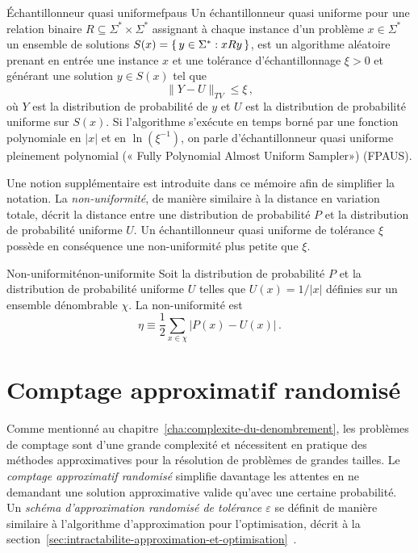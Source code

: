 \begin{maindefinition}{Échantillonneur quasi uniforme}{fpaus}
    Un échantillonneur quasi uniforme pour une relation binaire $R \subseteq \Sigma^{*} \times \Sigma^{*}$ assignant à chaque instance d'un problème $x \in \Sigma^{*}$ un ensemble de solutions $S(x) = \set{ y \in \Sigma^{*} : xRy }$, est un algorithme aléatoire prenant en entrée une instance $x$ et une tolérance d'échantillonnage $\xi > 0$ et générant une solution $y \in S(x)$ tel que
    \begin{equation*}
        \lVert Y - U \rVert_{TV} \leq \xi \,,
    \end{equation*}
    où $Y$ est la distribution de probabilité de $y$ et $U$ est la distribution de probabilité uniforme sur $S(x)$. Si l'algorithme s'exécute en temps borné par une fonction polynomiale en $\lvert x \rvert$ et en $\ln (\xi^{-1})$, on parle d'échantillonneur quasi uniforme pleinement polynomial (« Fully Polynomial Almost Uniform Sampler») (FPAUS).
\end{maindefinition}

Une notion supplémentaire est introduite dans ce mémoire afin de simplifier la notation. La \textit{non-uniformité}, de manière similaire à la distance en variation totale, décrit la distance entre une distribution de probabilité $P$ et la distribution de probabilité uniforme $U$. Un échantillonneur quasi uniforme de tolérance $\xi$ possède en conséquence une non-uniformité plus petite que $\xi$.

\begin{maindefinition}{Non-uniformité}{non-uniformite}
    Soit la distribution de probabilité $P$ et la distribution de probabilité uniforme $U$ telles que $U(x) = 1/\lvert x \rvert$ définies sur un ensemble dénombrable $\chi$. La non-uniformité est
    \begin{equation*}
        \eta \equiv \frac{1}{2} \sum_{x \in \chi} \lvert P(x) - U(x) \rvert \,. 
    \end{equation*}
\end{maindefinition}


\section{Comptage approximatif randomisé}
\label{sec:comptage-approximatif-randomise}

Comme mentionné au chapitre~\ref{cha:complexite-du-denombrement}, les problèmes de comptage sont d'une grande complexité et nécessitent en pratique des méthodes approximatives pour la résolution de problèmes de grandes tailles. Le \textit{comptage approximatif randomisé} simplifie davantage les attentes en ne demandant une solution approximative valide qu'avec une certaine probabilité. Un \textit{schéma d'approximation randomisé de tolérance $\varepsilon$} se définit de manière similaire à l'algorithme d'approximation pour l'optimisation, décrit à la section~\ref{sec:intractabilite-approximation-et-optimisation}~\cite{jerrumCountingSamplingIntegrating2003}. 

